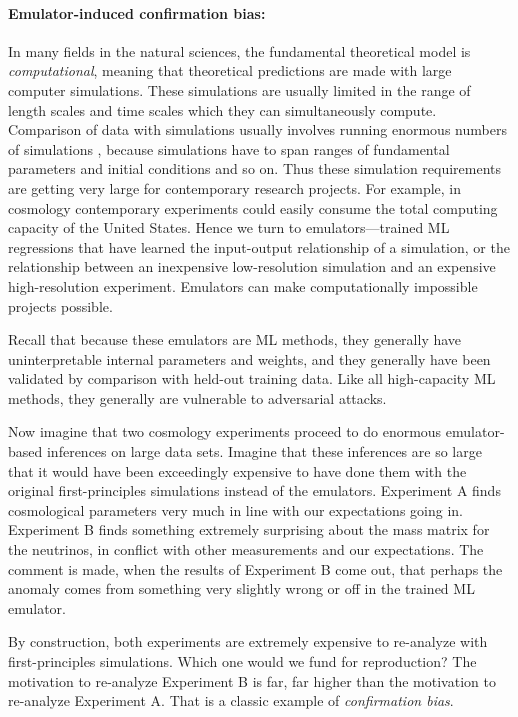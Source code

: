 \documentclass[10pt]{article}
\begin{document}
\paragraph{Emulator-induced confirmation bias:}
In many fields in the natural sciences, the fundamental theoretical model is \emph{computational}, meaning that theoretical predictions are made with large computer simulations.
These simulations are usually limited in the range of length scales and time scales which they can simultaneously compute.
Comparison of data with simulations usually involves running enormous numbers of simulations \cite{sbi}, because simulations have to span ranges of fundamental parameters and initial conditions and so on.
Thus these simulation requirements are getting very large for contemporary research projects.
For example, in cosmology contemporary experiments could easily consume the total computing capacity of the United States.
Hence we turn to emulators---trained ML regressions that have learned the input-output relationship of a simulation, or the relationship between an inexpensive low-resolution simulation and an expensive high-resolution experiment.
Emulators can make computationally impossible projects possible.

Recall that because these emulators are ML methods, they generally have uninterpretable internal parameters and weights, and they generally have been validated by comparison with held-out training data.
Like all high-capacity ML methods, they generally are vulnerable to adversarial attacks.

Now imagine that two cosmology experiments proceed to do enormous emulator-based inferences on large data sets.
Imagine that these inferences are so large that it would have been exceedingly expensive to have done them with the original first-principles simulations instead of the emulators.
Experiment A finds cosmological parameters very much in line with our expectations going in.
Experiment B finds something extremely surprising about the mass matrix for the neutrinos, in conflict with other measurements and our expectations.
The comment is made, when the results of Experiment B come out, that perhaps the anomaly comes from something very slightly wrong or off in the trained ML emulator.

By construction, both experiments are extremely expensive to re-analyze with first-principles simulations.
Which one would we fund for reproduction?
The motivation to re-analyze Experiment B is far, far higher than the motivation to re-analyze Experiment A.
That is a classic example of \emph{confirmation bias}.
\end{document}
